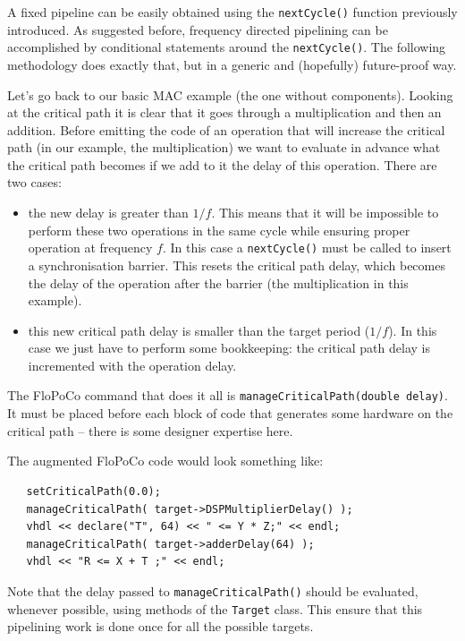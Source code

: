 \documentclass{article}
\begin{document}
A fixed pipeline can be easily obtained using the
\verb!nextCycle()! function previously introduced. As suggested before, frequency
directed pipelining can be accomplished by  conditional statements around the 
\verb!nextCycle()!. The following methodology does 
exactly that, but in a generic and (hopefully) future-proof way. 

Let's go back to our basic MAC example (the one without
components). Looking at the critical path it is clear that it goes
through a multiplication and then an addition. Before emitting the
code of an operation that will increase the critical path (in our
example, the multiplication) we want to evaluate in advance what the
critical path becomes if we add to it the delay of this
operation. There are two cases:
\begin{itemize}
\item the new delay is greater than $1/f$. This means that it will be
  impossible to perform these two operations in the same cycle while
  ensuring proper operation at frequency $f$. In this case a
  \verb!nextCycle()!  must be called to insert a
  synchronisation barrier. This resets the critical path delay, which becomes  the
  delay of the operation after the barrier (the multiplication in this
  example).
\item this new critical path delay is smaller than the target period
  ($1/f$). In this case we just have to perform some bookkeeping: the
  critical path delay is incremented with the operation delay.
\end{itemize}

The FloPoCo command that does it all is
\verb!manageCriticalPath(double delay)!. It must be placed before each
block of code that generates some hardware on the critical path --
there is some designer expertise here.

The augmented FloPoCo code would look something like:

\begin{verbatim}
   setCriticalPath(0.0);
   manageCriticalPath( target->DSPMultiplierDelay() );
   vhdl << declare("T", 64) << " <= Y * Z;" << endl;
   manageCriticalPath( target->adderDelay(64) );
   vhdl << "R <= X + T ;" << endl;
\end{verbatim}

Note that the delay passed to \texttt{manageCriticalPath()} should be
evaluated, whenever possible, using methods of the \texttt{Target}
class. This ensure that this pipelining work is done once for all the possible targets. 
\end{document}
